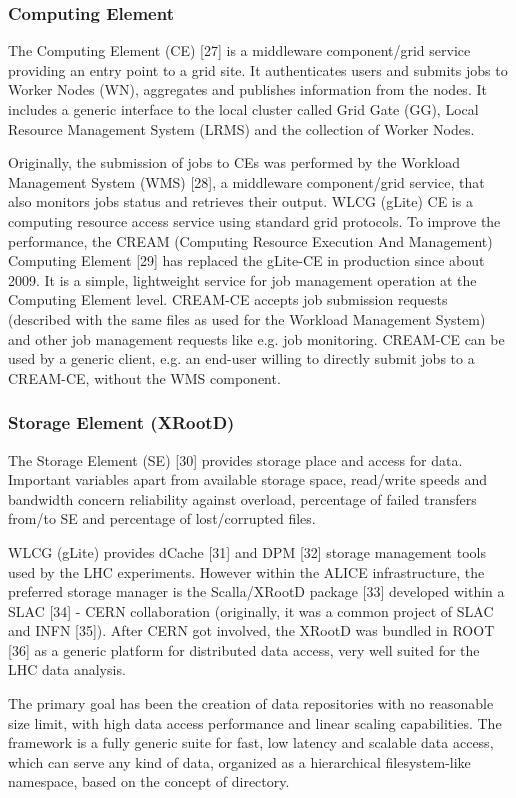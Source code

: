 \subsubsection{Computing Element}
%
The Computing Element (CE) [27] is a middleware component/grid
service providing an entry point to a grid site. It authenticates
users and submits jobs to Worker Nodes (WN), aggregates and
publishes information from the nodes. It includes a generic
interface to the local cluster called Grid Gate (GG), Local Resource
Management System (LRMS) and the collection of Worker Nodes.

Originally, the submission of jobs to CEs was performed by the Workload
Management System (WMS) [28], a middleware component/grid service,
that also monitors jobs status and retrieves their output. WLCG
(gLite) CE is a computing resource access service using standard
grid protocols. To improve the performance, the CREAM (Computing
Resource Execution And Management) Computing Element [29] has
replaced the gLite-CE in production since about 2009. It is a
simple, lightweight service for job management operation at the
Computing Element level. CREAM-CE accepts job submission requests
(described with the same files as used for the Workload Management
System) and other job management requests like e.g. job monitoring.
CREAM-CE can be used by a generic client, e.g. an end-user willing
to directly submit jobs to a CREAM-CE, without the WMS component.

\subsubsection{Storage Element (XRootD)}
%
The Storage Element (SE) [30] provides storage place and access for
data. Important variables apart from available storage space,
read/write speeds and bandwidth concern reliability against
overload, percentage of failed transfers from/to SE and percentage
of lost/corrupted files.

WLCG (gLite) provides dCache [31] and DPM [32] storage management
tools used by the LHC experiments. However within the ALICE
infrastructure, the preferred storage manager is the Scalla/XRootD
package [33] developed within a SLAC [34] - CERN collaboration
(originally, it was a common project of SLAC and INFN [35]). After
CERN got involved, the XRootD was bundled in ROOT [36] as a generic
platform for distributed data access, very well suited for the LHC
data analysis.

The primary goal has been the creation of data repositories with no
reasonable size limit, with high data access performance and linear
scaling capabilities. The framework is a fully generic suite for
fast, low latency and scalable data access, which can serve any kind
of data, organized as a hierarchical filesystem-like namespace,
based on the concept of directory.

